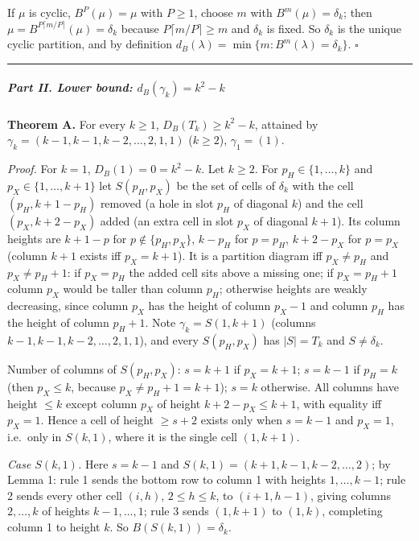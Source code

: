 \documentclass[11pt,a4paper]{article}
\begin{document}
If \(\mu\) is cyclic, \(B^P(\mu)=\mu\) with \(P\ge1\), choose \(m\) with
\(B^m(\mu)=\delta_k\); then \(\mu=B^{P\lceil m/P\rceil}(\mu)=\delta_k\)
because \(P\lceil m/P\rceil\ge m\) and \(\delta_k\) is fixed. So
\(\delta_k\) is the unique cyclic partition, and by definition
\(d_B(\lambda)=\min\{m:B^m(\lambda)=\delta_k\}\). \(\square\)

\begin{center}\rule{0.5\linewidth}{0.5pt}\end{center}

\subparagraph{\texorpdfstring{Part II. Lower bound:
\(d_B(\gamma_k)=k^2-k\)}{Part II. Lower bound: d\_B(\textbackslash gamma\_k)=k\^{}2-k}}\label{part-ii.-lower-bound-d_bgamma_kk2-k}

\textbf{Theorem A.} For every \(k\ge1\), \(D_B(T_k)\ge k^2-k\), attained
by \(\gamma_k=(k-1,k-1,k-2,\dots,2,1,1)\) (\(k\ge2\)), \(\gamma_1=(1)\).

\emph{Proof.} For \(k=1\), \(D_B(1)=0=k^2-k\). Let \(k\ge2\). For
\(p_H\in\{1,\dots,k\}\) and \(p_X\in\{1,\dots,k+1\}\) let \(S(p_H,p_X)\)
be the set of cells of \(\delta_k\) with the cell \((p_H,k+1-p_H)\)
removed (a hole in slot \(p_H\) of diagonal \(k\)) and the cell
\((p_X,k+2-p_X)\) added (an extra cell in slot \(p_X\) of diagonal
\(k+1\)). Its column heights are \(k+1-p\) for \(p\notin\{p_H,p_X\}\),
\(k-p_H\) for \(p=p_H\), \(k+2-p_X\) for \(p=p_X\) (column \(k+1\)
exists iff \(p_X=k+1\)). It is a partition diagram iff \(p_X\ne p_H\)
and \(p_X\ne p_H+1\): if \(p_X=p_H\) the added cell sits above a missing
one; if \(p_X=p_H+1\) column \(p_X\) would be taller than column
\(p_H\); otherwise heights are weakly decreasing, since column \(p_X\)
has the height of column \(p_X-1\) and column \(p_H\) has the height of
column \(p_H+1\). Note \(\gamma_k=S(1,k+1)\) (columns
\(k-1,k-1,k-2,\dots,2,1,1\)), and every \(S(p_H,p_X)\) has \(|S|=T_k\)
and \(S\ne\delta_k\).

Number of columns of \(S(p_H,p_X)\): \(s=k+1\) if \(p_X=k+1\); \(s=k-1\)
if \(p_H=k\) (then \(p_X\le k\), because \(p_X\ne p_H+1=k+1\)); \(s=k\)
otherwise. All columns have height \(\le k\) except column \(p_X\) of
height \(k+2-p_X\le k+1\), with equality iff \(p_X=1\). Hence a cell of
height \(\ge s+2\) exists only when \(s=k-1\) and \(p_X=1\), i.e.~only
in \(S(k,1)\), where it is the single cell \((1,k+1)\).

\emph{Case \(S(k,1)\).} Here \(s=k-1\) and
\(S(k,1)=(k+1,k-1,k-2,\dots,2)\); by Lemma 1: rule 1 sends the bottom
row to column 1 with heights \(1,\dots,k-1\); rule 2 sends every other
cell \((i,h)\), \(2\le h\le k\), to \((i+1,h-1)\), giving columns
\(2,\dots,k\) of heights \(k-1,\dots,1\); rule 3 sends \((1,k+1)\) to
\((1,k)\), completing column 1 to height \(k\). So
\(B(S(k,1))=\delta_k\).
\end{document}
